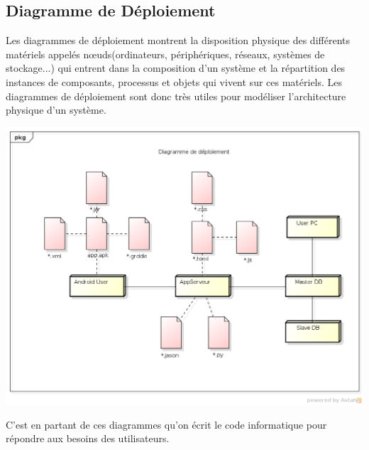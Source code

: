 \subsection{Diagramme de Déploiement}

Les diagrammes de déploiement montrent la disposition physique des différents matériels appelés nœuds(ordinateurs, périphériques, réseaux, systèmes de stockage...) qui entrent dans la composition d’un système et la répartition des instances de composants, processus et objets qui vivent sur ces matériels. Les diagrammes de déploiement sont donc très utiles pour modéliser l’architecture physique d’un système.

\begin{minipage}{1,2\textwidth}
	\includegraphics[width=0.7\linewidth]{mama/images/Deployment}
	\label{fig:deployment}
\end{minipage}


 C'est en partant de ces diagrammes qu'on écrit le code informatique pour répondre aux besoins des utilisateurs.


